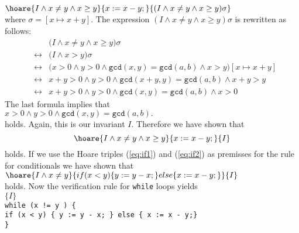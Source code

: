 $\hoare{I \wedge x \not= y \wedge x \geq y}{x := x - y;}{(I \wedge x \not= y \wedge x \geq y)\sigma}$ 
\\[0.2cm]
where $\sigma = [x \mapsto x + y]$. The expression $(I \wedge x \not= y \wedge x \geq y)\sigma$ is rewritten as follows:
\begin{eqnarray*}
 &   & \bigl(I \wedge x \not= y \wedge x \geq y\bigr)\sigma \\
 & \leftrightarrow & \bigl(I \wedge x > y \bigr)\sigma \\
 & \leftrightarrow & \bigl(x > 0 \wedge y > 0 \wedge \texttt{gcd}(x,y) = \texttt{gcd}(a,b) \wedge 
             x > y \bigr)[x \mapsto x + y] \\
 & \leftrightarrow & x + y > 0 \wedge y > 0 \wedge \texttt{gcd}(x+y,y) = \texttt{gcd}(a,b) 
       \wedge x + y > y  \\
 & \leftrightarrow & x + y > 0 \wedge y > 0 \wedge \texttt{gcd}(x,y) = \texttt{gcd}(a,b) 
       \wedge x > 0 
\end{eqnarray*}
The last formula implies that
\\[0.2cm]
\hspace*{1.3cm}
$ x > 0 \wedge y > 0 \wedge \texttt{gcd}(x,y) = \texttt{gcd}(a,b). $
\\[0.2cm]
holds.  Again, this is our invariant $I$.  Therefore we have shown that
\begin{equation}
  \label{eq:if2}
  \hoare{I \wedge x \not= y \wedge x \geq y}{x := x - y;}{I} 
\end{equation}
holds.  If we use the Hoare triples (\ref{eq:if1}) and (\ref{eq:if2}) as premisses
for the rule for conditionals we have shown that
\\[0.2cm]
\hspace*{1.3cm}
$  \hoare{I \wedge x \not= y}{if (x < y) \{ y := y - x; \} else \{  x := x - y; \}}{I} $
\\[0.2cm]
holds.  Now the verification rule for \texttt{while} loops yields
\\[0.2cm]
\hspace*{1.3cm}
$\{ I \}$
\\[0.1cm]
\hspace*{2.2cm}
\texttt{while (x != y ) \{} \\[0.1cm]
\hspace*{3.2cm}
         \texttt{if (x < y) \{ y := y - x; \} else \{ x := x - y;\}}
\\[0.1cm]
\hspace*{2.2cm}
\texttt{\}} \quad 
\\[0.1cm]
